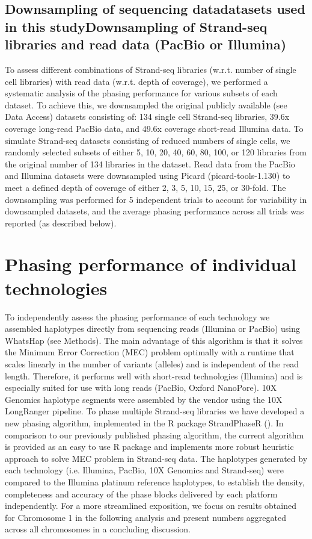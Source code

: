 \subsection{Downsampling of sequencing datadatasets used in this studyDownsampling of Strand-seq libraries and read data (PacBio or Illumina)}
	To assess different combinations of Strand-seq libraries (w.r.t. number of single cell libraries) with read data (w.r.t. depth of coverage), 
	we performed a systematic analysis of the phasing performance for various subsets of each dataset. 
	To achieve this, we downsampled the  original publicly available (see Data Access) datasets consisting of: 134 single cell Strand-seq libraries, 
	39.6x coverage long-read PacBio data, and 49.6x coverage short-read Illumina data. 
	To simulate Strand-seq datasets consisting of reduced numbers of single cells, we randomly selected subsets of either 5, 10, 20, 40, 60, 80, 100, or 120 libraries from the original number of 134  libraries in the dataset. 
	Read data from the PacBio and Illumina datasets were downsampled using Picard (picard-tools-1.130) to meet a defined depth of coverage of either 2, 3, 5, 10, 15, 25, or 30-fold. 
	The downsampling was performed for 5 independent trials to account for variability in downsampled datasets, and the average phasing performance across all trials was reported (as described below).
	

\section{Phasing performance of individual technologies}
	To independently assess the phasing performance of each technology we assembled haplotypes directly from sequencing reads (Illumina or PacBio) using WhatsHap (see Methods). 
	The main advantage of this algorithm is that it solves the Minimum Error Correction (MEC) problem optimally with a runtime that scales linearly in the number of variants (alleles) and is independent of the read length. 
	Therefore, it performs well with short-read technologies (Illumina) and is especially suited for use with long reads (PacBio, Oxford NanoPore). 10X Genomics haplotype segments were assembled by the vendor using the 10X LongRanger pipeline. 
	To phase multiple Strand-seq libraries we have developed a new phasing algorithm, implemented in the R package StrandPhaseR (). 
	In comparison to our previously published phasing algorithm, the current algorithm is provided as an easy to use R package and implements more robust heuristic approach to solve MEC problem in Strand-seq data.
	The haplotypes generated by each technology (i.e. Illumina, PacBio, 10X Genomics and Strand-seq) were compared to the Illumina platinum reference haplotypes, to establish the density, completeness and accuracy of the phase blocks delivered by each platform independently. 
	For a more streamlined exposition, we focus on results obtained for Chromosome 1 in the following analysis and present numbers aggregated across all chromosomes in a concluding discussion.
	

